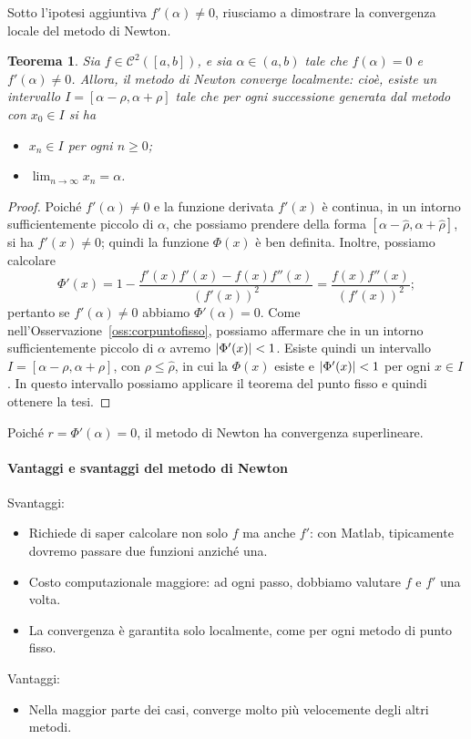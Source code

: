 \documentclass[a4paper]{report}
\DeclarePairedDelimiter{\abs}{\lvert}{\rvert}
\newtheorem{theorem}{Teorema}[chapter]
\theoremstyle{definiton}
\theoremstyle{remark}
\begin{document}
Sotto l'ipotesi aggiuntiva $f'(\alpha) \neq 0$, riusciamo a dimostrare la convergenza locale del metodo di Newton.

\begin{theorem}
Sia $f \in \mathcal{C}^2([a,b])$, e sia $\alpha \in (a,b)$ tale che $f(\alpha) = 0$ e $f'(\alpha) \neq 0$. Allora, il metodo di Newton converge localmente: cioè, esiste un intervallo $I = [\alpha - \rho,\alpha + \rho]$ tale che per ogni successione generata dal metodo con $x_0 \in I$ si ha
\begin{itemize}
    \item $x_n \in I$ per ogni $n\geq 0$;
    \item $\lim_{n\to \infty } x_n = \alpha$.
\end{itemize}
\end{theorem}
\begin{proof}
Poiché $f'(\alpha) \neq 0$ e la funzione derivata $f'(x)$ è continua, in un intorno sufficientemente piccolo di $\alpha$, che possiamo prendere della forma $[\alpha-\hat{\rho}, \alpha+\hat{\rho}]$, si ha $f'(x) \neq 0$; quindi la funzione $\Phi(x)$ è ben definita. Inoltre, possiamo calcolare
\begin{equation} \label{Phiprime}
    \Phi'(x) = 1 - \frac{f'(x)f'(x) - f(x)f''(x)}{(f'(x))^2} = \frac{f(x)f''(x)}{(f'(x))^2};
\end{equation}
pertanto se $f'(\alpha) \neq 0$ abbiamo $\Phi'(\alpha) = 0$. Come nell'Osservazione~\ref{oss:corpuntofisso}, possiamo affermare che in un intorno sufficientemente piccolo di $\alpha$ avremo $\abs{\Phi'(x)} < 1$. Esiste quindi un intervallo $I = [\alpha-\rho,\alpha+\rho]$, con $\rho\leq \hat{\rho}$, in cui la $\Phi(x)$ esiste e $\abs{\Phi'(x)} < 1$ per ogni $x\in I$. In questo intervallo possiamo applicare il teorema del punto fisso e quindi ottenere la tesi.
\end{proof}
Poiché $r = \Phi'(\alpha)=0$, il metodo di Newton ha convergenza superlineare.

\paragraph{Vantaggi e svantaggi del metodo di Newton}
Svantaggi:
\begin{itemize}
    \item Richiede di saper calcolare non solo $f$ ma anche $f'$: con Matlab, tipicamente dovremo passare due funzioni anziché una.
    \item Costo computazionale maggiore: ad ogni passo, dobbiamo valutare $f$ e $f'$ una volta.
    \item La convergenza è garantita solo localmente, come per ogni metodo di punto fisso.
\end{itemize}
Vantaggi:
\begin{itemize}
    \item Nella maggior parte dei casi, converge molto più velocemente degli altri metodi.
\end{itemize}
\end{document}
